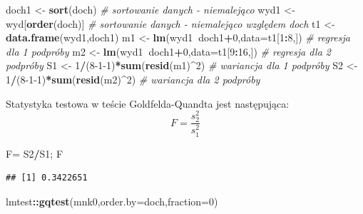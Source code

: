 \documentclass[polish,]{book}
\newenvironment{Shaded}{\begin{snugshade}}{\end{snugshade}}
\newcommand{\CommentTok}[1]{\textcolor[rgb]{0.56,0.35,0.01}{\textit{#1}}}
\newcommand{\DataTypeTok}[1]{\textcolor[rgb]{0.13,0.29,0.53}{#1}}
\newcommand{\DecValTok}[1]{\textcolor[rgb]{0.00,0.00,0.81}{#1}}
\newcommand{\KeywordTok}[1]{\textcolor[rgb]{0.13,0.29,0.53}{\textbf{#1}}}
\newcommand{\NormalTok}[1]{#1}
\newcommand{\OperatorTok}[1]{\textcolor[rgb]{0.81,0.36,0.00}{\textbf{#1}}}
\newcommand{\StringTok}[1]{\textcolor[rgb]{0.31,0.60,0.02}{#1}}
\begin{document}
\begin{Shaded}
\begin{Highlighting}[]
\NormalTok{doch1 <-}\StringTok{ }\KeywordTok{sort}\NormalTok{(doch)      }\CommentTok{# sortowanie danych - niemalejąco}
\NormalTok{wyd1 <-}\StringTok{ }\NormalTok{wyd[}\KeywordTok{order}\NormalTok{(doch)] }\CommentTok{# sortowanie danych - niemalejąco względem doch}
\NormalTok{t1 <-}\StringTok{ }\KeywordTok{data.frame}\NormalTok{(wyd1,doch1)}
\NormalTok{m1 <-}\StringTok{ }\KeywordTok{lm}\NormalTok{(wyd1}\OperatorTok{~}\NormalTok{doch1}\OperatorTok{+}\DecValTok{0}\NormalTok{,}\DataTypeTok{data=}\NormalTok{t1[}\DecValTok{1}\OperatorTok{:}\DecValTok{8}\NormalTok{,])  }\CommentTok{# regresja dla 1 podpróby}
\NormalTok{m2 <-}\StringTok{ }\KeywordTok{lm}\NormalTok{(wyd1}\OperatorTok{~}\NormalTok{doch1}\OperatorTok{+}\DecValTok{0}\NormalTok{,}\DataTypeTok{data=}\NormalTok{t1[}\DecValTok{9}\OperatorTok{:}\DecValTok{16}\NormalTok{,]) }\CommentTok{# regresja dla 2 podpróby}
\NormalTok{S1 <-}\StringTok{ }\DecValTok{1}\OperatorTok{/}\NormalTok{(}\DecValTok{8-1-1}\NormalTok{)}\OperatorTok{*}\KeywordTok{sum}\NormalTok{(}\KeywordTok{resid}\NormalTok{(m1)}\OperatorTok{^}\DecValTok{2}\NormalTok{) }\CommentTok{# wariancja dla 1 podpróby}
\NormalTok{S2 <-}\StringTok{ }\DecValTok{1}\OperatorTok{/}\NormalTok{(}\DecValTok{8-1-1}\NormalTok{)}\OperatorTok{*}\KeywordTok{sum}\NormalTok{(}\KeywordTok{resid}\NormalTok{(m2)}\OperatorTok{^}\DecValTok{2}\NormalTok{) }\CommentTok{# wariancja dla 2 podpróby}
\end{Highlighting}
\end{Shaded}

Statystyka testowa w teście Goldfelda-Quandta jest następująca:
\begin{equation}
F=\frac{s_2^2}{s_1^2}
\label{eq:wz1315}
\end{equation}

\begin{Shaded}
\begin{Highlighting}[]
\NormalTok{F=}\StringTok{ }\NormalTok{S2}\OperatorTok{/}\NormalTok{S1; F}
\end{Highlighting}
\end{Shaded}

\begin{verbatim}
## [1] 0.3422651
\end{verbatim}

\begin{Shaded}
\begin{Highlighting}[]
\NormalTok{lmtest}\OperatorTok{::}\KeywordTok{gqtest}\NormalTok{(mnk0,}\DataTypeTok{order.by=}\NormalTok{doch,}\DataTypeTok{fraction=}\DecValTok{0}\NormalTok{)}
\end{Highlighting}
\end{Shaded}
\end{document}

